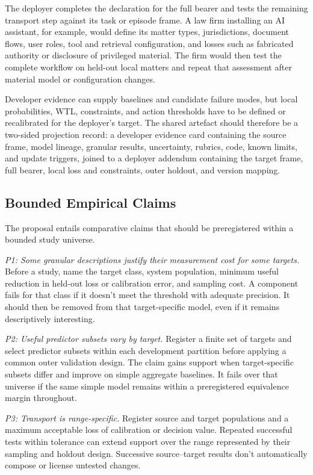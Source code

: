 \documentclass[12pt]{article}
\begin{document}
The deployer completes the declaration for the full bearer and tests the remaining transport step against its task or episode frame. A law firm installing an AI assistant, for example, would define its matter types, jurisdictions, document flows, user roles, tool and retrieval configuration, and losses such as fabricated authority or disclosure of privileged material. The firm would then test the complete workflow on held-out local matters and repeat that assessment after material model or configuration changes.

Developer evidence can supply baselines and candidate failure modes, but local probabilities, WTL, constraints, and action thresholds have to be defined or recalibrated for the deployer's target. The shared artefact should therefore be a two-sided projection record: a developer evidence card containing the source frame, model lineage, granular results, uncertainty, rubrics, code, known limits, and update triggers, joined to a deployer addendum containing the target frame, full bearer, local loss and constraints, outer holdout, and version mapping.

\subsection{Bounded Empirical Claims}\label{sec:predictions}

The proposal entails comparative claims that should be preregistered within a bounded study universe.

\emph{P1: Some granular descriptions justify their measurement cost for some targets.} Before a study, name the target class, system population, minimum useful reduction in held-out loss or calibration error, and sampling cost. A component fails for that class if it doesn't meet the threshold with adequate precision. It should then be removed from that target-specific model, even if it remains descriptively interesting.

\emph{P2: Useful predictor subsets vary by target.} Register a finite set of targets and select predictor subsets within each development partition before applying a common outer validation design. The claim gains support when target-specific subsets differ and improve on simple aggregate baselines. It fails over that universe if the same simple model remains within a preregistered equivalence margin throughout.

\emph{P3: Transport is range-specific.} Register source and target populations and a maximum acceptable loss of calibration or decision value. Repeated successful tests within tolerance can extend support over the range represented by their sampling and holdout design. Successive source--target results don't automatically compose or license untested changes.
\end{document}
